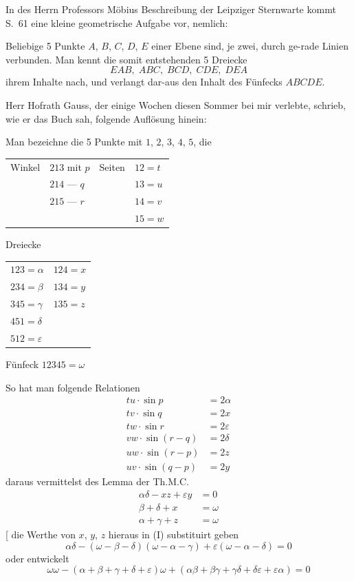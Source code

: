 \documentclass[12pt,a4paper]{article}
\begin{document}
In des Herrn Professors M\"obius Beschreibung der Leipziger Sternwarte
kommt S.~61 eine kleine geometrische Aufgabe vor, nemlich:

Beliebige 5 Punkte $A$, $B$, $C$, $D$, $E$ einer Ebene sind, je zwei, durch ge-\/rade Linien verbunden. Man kennt die somit entstehenden 5 Dreiecke
\[
EAB,\; ABC,\; BCD,\; CDE,\; DEA
\]
ihrem Inhalte nach, und verlangt dar-\/aus den Inhalt des F\"unfecks $ABCDE$.

Herr Hofrath Gauss, der einige Wochen diesen Sommer bei mir verlebte,
schrieb, wie er das Buch sah, folgende Aufl\"osung hinein:

Man bezeichne die 5 Punkte mit $1$, $2$, $3$, $4$, $5$, die\\[4pt]
\begin{tabular}{llll}
Winkel & $213$ mit $p$ & Seiten & $12 = t$ \\
       & $214$ --- $q$ &        & $13 = u$ \\
       & $215$ --- $r$ &        & $14 = v$ \\
       &               &        & $15 = w$
\end{tabular}

Dreiecke
\begin{tabular}{ll}
$123 = \alpha$ & $124 = x$ \\
$234 = \beta$  & $134 = y$ \\
$345 = \gamma$ & $135 = z$ \\
$451 = \delta$ & \\
$512 = \varepsilon$ &
\end{tabular}

F\"unfeck $12345 = \omega$

\newpage
So hat man folgende Relationen
\begin{align*}
tu \cdot \sin p &= 2\alpha \\
tv \cdot \sin q &= 2x \\
tw \cdot \sin r &= 2\varepsilon \\
vw \cdot \sin(r-q) &= 2\delta \\
uw \cdot \sin(r-p) &= 2z \\
uv \cdot \sin(q-p) &= 2y
\end{align*}
daraus vermittelst des Lemma der Th.M.C.
\begin{align*}
\alpha\delta - xz + \varepsilon y &= 0 \tag{I} \\
\beta + \delta + x &= \omega \\
\alpha + \gamma + z &= \omega
\end{align*}
[ die Werthe von $x$, $y$, $z$ hieraus in (I) substituirt geben
\[
\alpha\delta - (\omega - \beta - \delta)(\omega - \alpha - \gamma) + \varepsilon(\omega - \alpha - \delta) = 0
\]
oder entwickelt
\[
\omega\omega - (\alpha+\beta+\gamma+\delta+\varepsilon)\omega + (\alpha\beta+\beta\gamma+\gamma\delta+\delta\varepsilon+\varepsilon\alpha) = 0
\]
\end{document}
